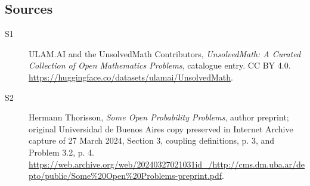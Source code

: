\documentclass[11pt]{article}
\begin{document}
\subsection{Sources}
\begin{description}
\item[\hypertarget{source:statement:1}{S1}] ULAM.AI and the UnsolvedMath Contributors, \emph{UnsolvedMath: A Curated Collection of Open Mathematics Problems}, catalogue entry. CC BY 4.0. \url{https://huggingface.co/datasets/ulamai/UnsolvedMath}.
\item[\hypertarget{source:statement:2}{S2}] Hermann Thorisson, \emph{Some Open Probability Problems}, author preprint; original Universidad de Buenos Aires copy preserved in Internet Archive capture of 27 March 2024, Section 3, coupling definitions, p. 3, and Problem 3.2, p. 4. \url{https://web.archive.org/web/20240327021031id_/http://cms.dm.uba.ar/depto/public/Some%20Open%20Problems-preprint.pdf}.
\end{description}
\label{end:statement}
\end{document}
